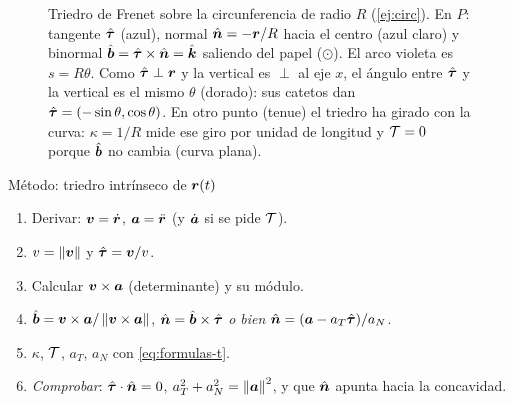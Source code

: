 \begin{figure}[ht]
\caption{Triedro de Frenet sobre la circunferencia de radio $R$ (\cref{ej:circ}).
En $P$: tangente $\hat{\bm{\tau}}$ (azul), normal $\hat{\bm{n}}=-\bm{r}/R$ hacia el centro (azul claro)
y binormal $\hat{\bm{b}}=\hat{\bm{\tau}}\times\hat{\bm{n}}=\hat{\bm{k}}$ saliendo del papel ($\odot$). El arco
violeta es $s=R\theta$. Como $\hat{\bm{\tau}}\perp\bm{r}$ y la vertical es $\perp$ al eje $x$,
el ángulo entre $\hat{\bm{\tau}}$ y la vertical es el mismo $\theta$ (dorado): sus catetos
dan $\hat{\bm{\tau}}=(-\sin\theta,\cos\theta)$. En otro punto (tenue) el triedro ha girado con la
curva: $\kappa=1/R$ mide ese giro por unidad de longitud y $\mathcal{T}=0$ porque
$\hat{\bm{b}}$ no cambia (curva plana).}
\label{fig:circunferencia}
\end{figure}

\begin{clave}{Método: triedro intrínseco de $\bm{r}(t)$}
\begin{enumerate}[leftmargin=1.4em]
  \item Derivar: $\bm{v}=\dot{\bm{r}}$, $\bm{a}=\ddot{\bm{r}}$ (y $\dot{\bm{a}}$ si se pide $\mathcal{T}$).
  \item $v=\left\lVert \bm{v}\right\rVert$ y $\hat{\bm{\tau}}=\bm{v}/v$.
  \item Calcular $\bm{v}\times\bm{a}$ (determinante) y su módulo.
  \item $\hat{\bm{b}}=\bm{v}\times\bm{a}/\left\lVert \bm{v}\times\bm{a}\right\rVert$, $\hat{\bm{n}}=\hat{\bm{b}}\times\hat{\bm{\tau}}$
        \emph{o bien} $\hat{\bm{n}}=(\bm{a}-a_{T}\hat{\bm{\tau}})/a_{N}$.
  \item $\kappa$, $\mathcal{T}$, $a_{T}$, $a_{N}$ con \eqref{eq:formulas-t}.
  \item \emph{Comprobar}: $\hat{\bm{\tau}}\cdot\hat{\bm{n}}=0$, $a_{T}^{2}+a_{N}^{2}=\left\lVert \bm{a}\right\rVert^{2}$, y que
        $\hat{\bm{n}}$ apunta hacia la concavidad.
\end{enumerate}
\end{clave}
